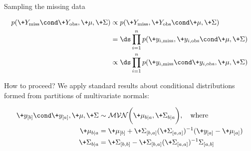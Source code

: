\documentclass[10pt]{beamer}
\begin{document}
\begin{frame}{Sampling the missing data}

\scriptsize 
\begin{align*}
p(\+Y_\text{miss} \cond \+Y_\text{obs}, \+\mu, \+\Sigma) & \propto p(\+Y_\text{miss},  \+Y_\text{obs} \cond  \+\mu, \+\Sigma) \\
&= \ds\prod_{i=1}^n p(\+y_{i, \text{miss}}, \+y_{i, \text{obs}} \cond \+\mu, \+\Sigma) \\
&\propto \ds\prod_{i=1}^n p(\+y_{i, \text{miss}} \cond \+y_{i, \text{obs}},  \+\mu, \+\Sigma) \\
\end{align*}

How to proceed? \pause  We apply standard results about conditional distributions formed from partitions of multivariate normals:

\begin{align*}
\+y_{[b]} \cond \+y_{[a]}, \+\mu, \+\Sigma & \sim \mathcal{MVN} \bigg( \+\mu_{b|a}, \+\Sigma_{b|a}  \bigg), \quad \text{where} \\
\+\mu_{b|a} &= \+\mu_{[b]} + \+\Sigma_{[b,a]} (\+\Sigma_{[a,a]})^{-1} (\+y_{[a]} - \+\mu_{[a]}) \\
\+\Sigma_{b|a}  &= \+\Sigma_{[b,b]} -  \+\Sigma_{[b,a]} (\+\Sigma_{[a,a]})^{-1} 	\Sigma_{[a,b]}
\end{align*}


\end{frame}
\end{document}
